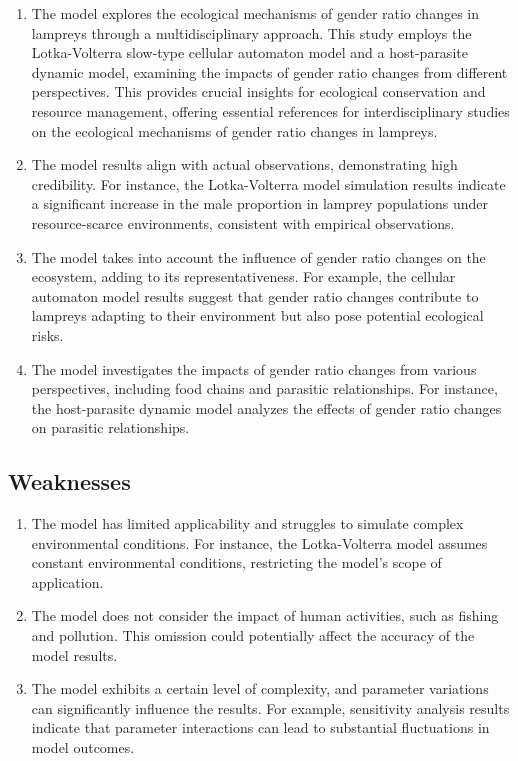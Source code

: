 \documentclass[CTeX = true]{mcmthesis}  %
\begin{document}
\begin{enumerate}
	\item The model explores the ecological mechanisms of gender ratio changes in lampreys through a multidisciplinary approach. This study employs the Lotka-Volterra slow-type cellular automaton model and a host-parasite dynamic model, examining the impacts of gender ratio changes from different perspectives. This provides crucial insights for ecological conservation and resource management, offering essential references for interdisciplinary studies on the ecological mechanisms of gender ratio changes in lampreys.

   \item The model results align with actual observations, demonstrating high credibility. For instance, the Lotka-Volterra model simulation results indicate a significant increase in the male proportion in lamprey populations under resource-scarce environments, consistent with empirical observations.

   \item The model takes into account the influence of gender ratio changes on the ecosystem, adding to its representativeness. For example, the cellular automaton model results suggest that gender ratio changes contribute to lampreys adapting to their environment but also pose potential ecological risks.

   \item The model investigates the impacts of gender ratio changes from various perspectives, including food chains and parasitic relationships. For instance, the host-parasite dynamic model analyzes the effects of gender ratio changes on parasitic relationships.
\end{enumerate}

\subsection{Weaknesses}

\begin{enumerate}
	\item The model has limited applicability and struggles to simulate complex environmental conditions. For instance, the Lotka-Volterra model assumes constant environmental conditions, restricting the model's scope of application.

   \item The model does not consider the impact of human activities, such as fishing and pollution. This omission could potentially affect the accuracy of the model results.


      \item The model exhibits a certain level of complexity, and parameter variations can significantly influence the results. For example, sensitivity analysis results indicate that parameter interactions can lead to substantial fluctuations in model outcomes.
\end{enumerate}
\end{document}
